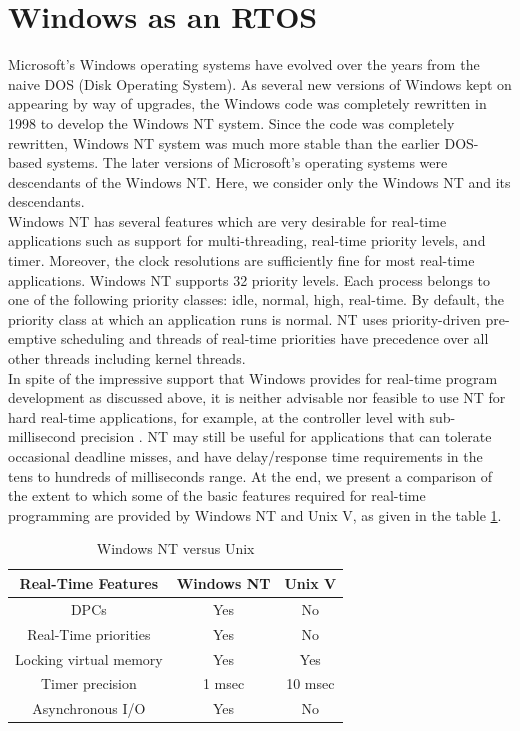 \documentclass[12pt]{report}
\begin{document}
\section{Windows as an RTOS}
Microsoft’s Windows operating systems have evolved over the years from the naive DOS (Disk Operating System). As several new versions of Windows kept on appearing by way of upgrades, the Windows code was completely rewritten in 1998 to develop the Windows NT system. Since the code was completely rewritten, Windows NT system was much more stable than the earlier DOS-based systems. The later versions of Microsoft’s operating systems were descendants of the Windows NT. Here, we consider only the Windows NT and its descendants.\\

Windows NT has several features which are very desirable for real-time applications such as support for multi-threading, real-time priority levels, and timer. Moreover, the clock resolutions are sufficiently fine for most real-time applications. Windows NT supports 32 priority levels. Each process belongs to one of the following priority classes: idle, normal, high, real-time. By default, the priority class at which an application runs is normal. NT uses priority-driven pre-emptive scheduling and threads of real-time priorities have precedence over all other threads including kernel threads. \\

In spite of the impressive support that Windows provides for real-time program development as discussed above, it is neither advisable nor feasible to use NT for hard real-time applications, for example, at the controller level with sub-millisecond precision \cite{windowsnt-k}. NT may still be useful for applications that can tolerate occasional deadline misses, and have delay/response time requirements in the tens to hundreds of milliseconds range. At the end, we present a comparison of the extent to which some of the basic features required for real-time programming are provided by Windows NT and Unix V, as given in the table \ref{table:4}. 
\begin{table}[h]
\centering
\begin{tabular}{|c|c|c|}
 \hline
 \textbf{Real-Time Features} &  \textbf{Windows NT} & \textbf{Unix V}\\
 \hline \hline
 DPCs & Yes & No \\
 \hline
 Real-Time priorities & Yes & No \\
 \hline
 Locking virtual memory & Yes & Yes\\
 \hline 
 Timer precision & 1 msec & 10 msec \\
 \hline
 Asynchronous I/O & Yes & No\\
 \hline
\end{tabular}
\caption{Windows NT versus Unix}
\label{table:4}
\end{table}
\end{document}
